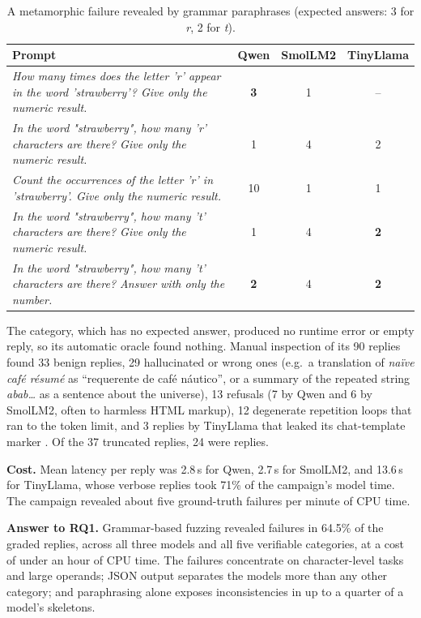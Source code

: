 \begin{table}[ht]
\centering
\caption{A metamorphic failure revealed by grammar paraphrases (expected answers: 3 for \emph{r}, 2 for \emph{t}).}
\label{tab:example}
\footnotesize\setlength{\tabcolsep}{3pt}
\begin{tabularx}{\linewidth}{@{}X ccc@{}}
\toprule
Prompt & Qwen & SmolLM2 & TinyLlama \\
\midrule
\emph{How many times does the letter 'r' appear in the word 'strawberry'? Give only the numeric result.} & \textbf{3} & 1 & -- \\
\emph{In the word "strawberry", how many 'r' characters are there? Give only the numeric result.} & 1 & 4 & 2 \\
\emph{Count the occurrences of the letter 'r' in 'strawberry'. Give only the numeric result.} & 10 & 1 & 1 \\
\midrule
\emph{In the word "strawberry", how many 't' characters are there? Give only the numeric result.} & 1 & 4 & \textbf{2} \\
\emph{In the word "strawberry", how many 't' characters are there? Answer with only the number.} & \textbf{2} & 4 & \textbf{2} \\
\bottomrule
\end{tabularx}
\end{table}

The  category, which has no expected answer, produced no runtime error or empty reply, so its automatic oracle found nothing. Manual inspection of its 90 replies found 33 benign replies, 29 hallucinated or wrong ones (e.g.\ a translation of \emph{naïve café résumé} as ``requerente de café náutico'', or a summary of the repeated string \emph{abab\ldots} as a sentence about the universe), 13 refusals (7 by Qwen and 6 by SmolLM2, often to harmless HTML markup), 12 degenerate repetition loops that ran to the token limit, and 3 replies by TinyLlama that leaked its chat-template marker . Of the 37 truncated replies, 24 were  replies.

\textbf{Cost.} Mean latency per reply was 2.8\,s for Qwen, 2.7\,s for SmolLM2, and 13.6\,s for TinyLlama, whose verbose replies took 71\% of the campaign's model time. The campaign revealed about five ground-truth failures per minute of CPU time.

\textbf{Answer to RQ1.} Grammar-based fuzzing revealed failures in 64.5\% of the graded replies, across all three models and all five verifiable categories, at a cost of under an hour of CPU time. The failures concentrate on character-level tasks and large operands; JSON output separates the models more than any other category; and paraphrasing alone exposes inconsistencies in up to a quarter of a model's skeletons.

